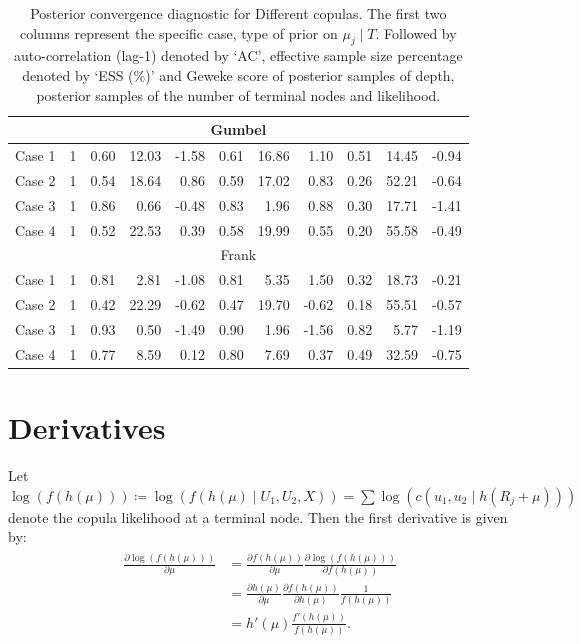 \documentclass{amsart}
\begin{document}
\begin{table}[ht]
{\begin{tabular}{lc|crr|crr|crr}
			\midrule
			\multicolumn{11}{c}{Gumbel} \\
			\midrule
			Case 1 & 1 & 0.60 & 12.03 & -1.58 & 0.61 & 16.86 & 1.10 & 0.51 & 14.45 & -0.94 \\ 
			Case 2 & 1 & 0.54 & 18.64 & 0.86 & 0.59 & 17.02 & 0.83 & 0.26 & 52.21 & -0.64 \\ 
			Case 3 & 1 & 0.86 & 0.66 & -0.48 & 0.83 & 1.96 & 0.88 & 0.30 & 17.71 & -1.41 \\ 
			Case 4 & 1 & 0.52 & 22.53 & 0.39 & 0.58 & 19.99 & 0.55 & 0.20 & 55.58 & -0.49 \\ 
			\midrule
			\multicolumn{11}{c}{Frank} \\
			\midrule
			Case 1 & 1 & 0.81 & 2.81 & -1.08 & 0.81 & 5.35 & 1.50 & 0.32 & 18.73 & -0.21 \\ 
			Case 2 & 1 & 0.42 & 22.29 & -0.62 & 0.47 & 19.70 & -0.62 & 0.18 & 55.51 & -0.57 \\ 
			Case 3 & 1 & 0.93 & 0.50 & -1.49 & 0.90 & 1.96 & -1.56 & 0.82 & 5.77 & -1.19 \\ 
			Case 4 & 1 & 0.77 & 8.59 & 0.12 & 0.80 & 7.69 & 0.37 & 0.49 & 32.59 & -0.75 \\ 
			\bottomrule
	\end{tabular}
\caption{Posterior convergence diagnostic for Different copulas. The first two columns represent the specific case, type of prior on $\mu_j\mid T$. Followed by auto-correlation (lag-1) denoted by `AC', effective sample size percentage denoted by `ESS (\%)' and Geweke score of posterior samples of depth, posterior samples of the number of terminal nodes and likelihood.}\label{tab:gauss:convergence}}
\end{table}

\appendix

\section{Derivatives}
Let $\log(f(h(\mu)))\coloneqq \log(f(h(\mu)\mid U_1,U_2,X)) = \sum\log\left(c(u_1,u_2\mid h(R_j+\mu))\right)$ denote the copula likelihood at a terminal node. Then the first derivative is given by:
\begin{align}
	\begin{split}
		\frac{\partial \log(f(h(\mu)))}{\partial \mu} 
		& = \frac{\partial f(h(\mu))}{\partial \mu}\frac{\partial \log(f(h(\mu)))}{\partial f(h(\mu))}\\
		& = \frac{\partial h(\mu)}{\partial \mu}\frac{\partial f(h(\mu))}{\partial h(\mu)}\frac{1}{f(h(\mu))} \\
		& = h'(\mu)\frac{f'(h(\mu))}{f(h(\mu))}.
	\end{split}
\end{align}
\end{document}
